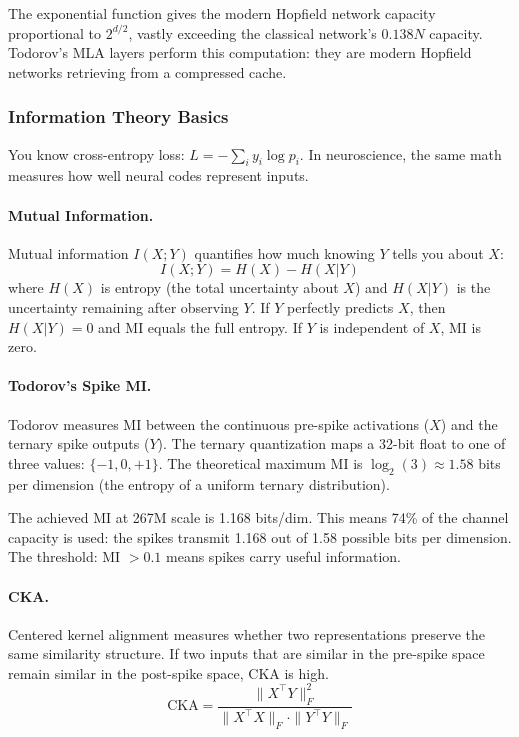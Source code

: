 \documentclass[11pt,a4paper]{article}
\begin{document}
The exponential function gives the modern Hopfield network capacity proportional to $2^{d/2}$, vastly exceeding the classical network's $0.138 N$ capacity. Todorov's MLA layers perform this computation: they are modern Hopfield networks retrieving from a compressed cache.

\subsubsection{Information Theory Basics}

You know cross-entropy loss: $L = -\sum_i y_i \log p_i$. In neuroscience, the same math measures how well neural codes represent inputs.

\paragraph{Mutual Information.}

Mutual information $I(X;Y)$ quantifies how much knowing $Y$ tells you about $X$:
\[
  I(X;Y) = H(X) - H(X|Y)
\]
where $H(X)$ is entropy (the total uncertainty about $X$) and $H(X|Y)$ is the uncertainty remaining after observing $Y$. If $Y$ perfectly predicts $X$, then $H(X|Y) = 0$ and MI equals the full entropy. If $Y$ is independent of $X$, MI is zero.

\paragraph{Todorov's Spike MI.}

Todorov measures MI between the continuous pre-spike activations ($X$) and the ternary spike outputs ($Y$). The ternary quantization maps a 32-bit float to one of three values: $\{-1, 0, +1\}$. The theoretical maximum MI is $\log_2(3) \approx 1.58$ bits per dimension (the entropy of a uniform ternary distribution).

The achieved MI at 267M scale is 1.168 bits/dim. This means 74\% of the channel capacity is used: the spikes transmit 1.168 out of 1.58 possible bits per dimension. The threshold: MI $> 0.1$ means spikes carry useful information.

\paragraph{CKA.}

Centered kernel alignment measures whether two representations preserve the same similarity structure. If two inputs that are similar in the pre-spike space remain similar in the post-spike space, CKA is high.
\[
  \mathrm{CKA} = \frac{\|X^\top Y\|_F^2}{\|X^\top X\|_F \cdot \|Y^\top Y\|_F}
\]
\end{document}
